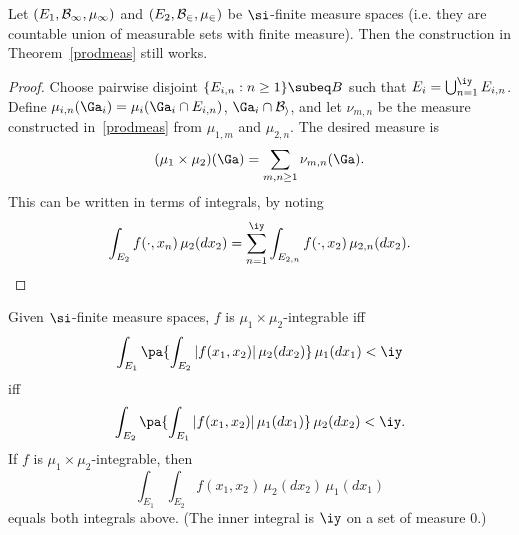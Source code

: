 \begin{thm}[Tonelli] Let $(E_1,\cal B_1, \mu_1)$ and $(E_2,\cal B_2, \mu_2)$ be $\si$-finite measure spaces (i.e. they are countable union of measurable sets with finite measure). Then the construction in Theorem~\ref{prodmeas} still works.
\end{thm}
\begin{proof}
Choose pairwise disjoint $\{E_{i,n}:n\ge 1\}\subeq B$ such that $E_i=\bigcup_{n=1}^{\iy}E_{i,n}$. %
Define $\mu_{i,n}(\Ga_i)=\mu_i(\Ga_i\cap E_{i,n})$, $\Ga_i\cap \cal B_i$, and let $\nu_{m,n}$ be the measure constructed in~\ref{prodmeas} from $\mu_{1,m}$ and $\mu_{2,n}$. The desired measure is
\[
(\mu_1\times \mu_2)(\Ga)=\sum_{m,n\geq 1} \nu_{m,n}(\Ga).
\]
This can be written in terms of integrals, by noting
\[
\int_{E_2} f(\cdot,x_n)\,\mu_2(dx_2)=\sum_{n=1}^{\iy}\int_{E_{2,n}}f(\cdot, x_2)\,\mu_{2,n}(dx_2).
\]
\end{proof}
\begin{thm}[Fubini]\label{fubini}
Given $\si$-finite measure spaces, $f$ is $\mu_1\times \mu_2$-integrable iff
\[
\int_{E_1}\pa{\int_{E_2} |f(x_1,x_2)|\,\mu_2(dx_2)}\,\mu_1(dx_1)<\iy
\]
iff
\[
\int_{E_2}\pa{\int_{E_1} |f(x_1,x_2)|\,\mu_1(dx_1)}\,\mu_2(dx_2)<\iy.
\]
If $f$ is $\mu_1\times \mu_2$-integrable, then 
\[
\int_{E_1}\int_{E_2}f(x_1,x_2)\,\mu_2(dx_2)\,\mu_1(dx_1)
\]
equals both integrals above.
(The inner integral is $\iy$ on a set of measure 0.)
\end{thm}
